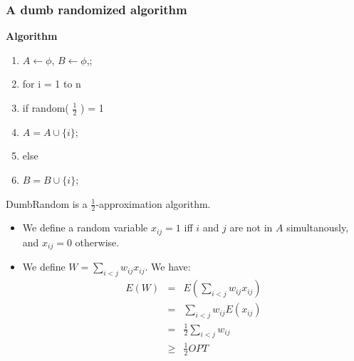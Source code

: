 \documentclass[mathserif]{beamer}
\begin{document}

\frame
{
\frametitle{ A dumb randomized algorithm } 
{\bf Algorithm}\\
\begin{enumerate} 
 \item $A \leftarrow \phi$, $B \leftarrow \phi$,; 
 \item for i = 1 to n 
 \item 	 \quad if random( $\tfrac{1}{2}$ ) = 1 
 \item   \qquad  $A=A\cup \{i\}$; 
 \item   \quad else
 \item 	 \qquad  $B=B\cup \{i\}$; 
\end{enumerate}
\begin{Theorem} 
  DumbRandom is a $\tfrac{1}{2}$-approximation algorithm.  
\end{Theorem}
}

\frame
{
\begin{Proof} 
 \begin{itemize} 
  \item We define a random variable $x_{ij} = 1 $ iff $i$ and $j$ are not in $A$ simultanously, and $x_{ij}=0$ otherwise. 
  \item We define $W=\sum_{i<j} w_{ij}x_{ij}$. We have: 
   \begin{eqnarray} 
    E(W) & = & E(\sum_{i<j} w_{ij}x_{ij}) \\ 
         & = & \sum_{i<j} w_{ij} E(x_{ij}) \\ 
  & = & \tfrac{1}{2} \sum_{i<j} w_{ij} \\ 
  & \geq  & \tfrac{1}{2} OPT
   \end{eqnarray}
 \end{itemize}

\end{Proof}
}
\end{document}
